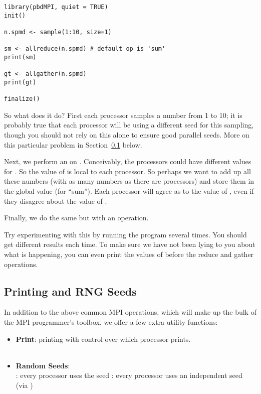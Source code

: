 \begin{lstlisting}[language=rr,title=Simple pbdMPI Example 2]
library(pbdMPI, quiet = TRUE)
init()

n.spmd <- sample(1:10, size=1)

sm <- allreduce(n.spmd) # default op is 'sum'
print(sm)

gt <- allgather(n.spmd)
print(gt)

finalize()
\end{lstlisting}

So what does it do?  First each processor samples a number from 1 to 10; it is probably true that each processor will be using a different seed for this sampling, though you should not rely on this alone to ensure good parallel seeds.  More on this particular problem in Section~\ref{sec:pbdsugar} below.

Next, we perform an  on .  Conceivably, the processors could have different values for .  So the value of  is local to each processor.  So perhaps we want to add up all these numbers (with as many numbers as there are processors) and store them in the global value  (for ``sum'').  Each processor will agree as to the value of , even if they disagree about the value of .

Finally, we do the same but with an  operation.  

Try experimenting with this by running the program several times.  You should get different results each time.  To make sure we have not been lying to you about what is happening, you can even print the values of  before the reduce and gather operations.



\subsection{Printing and RNG Seeds}\label{sec:pbdsugar}

In addition to the above common MPI operations, which will make up the bulk of the MPI programmer's toolbox, we offer a few extra utility functions:

\begin{itemize}
  \item \textbf{Print}: printing with control over which processor prints.\\
  \\
  \item \textbf{Random Seeds}: \\
  :  every processor uses the seed 
  : every processor uses an independent seed (via )
\end{itemize}

